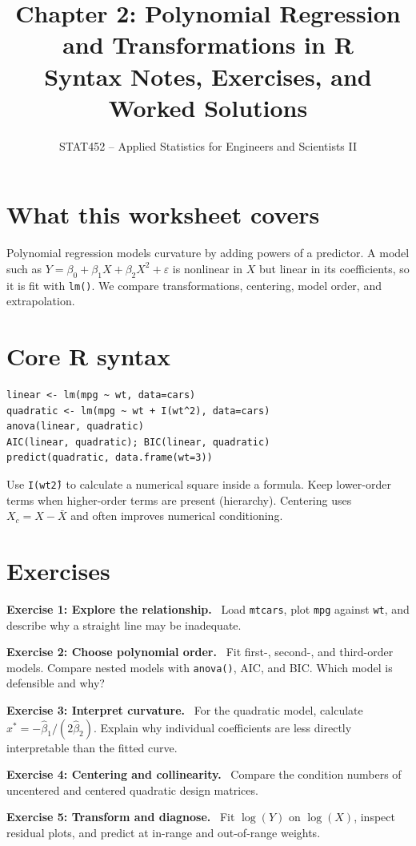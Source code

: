 \documentclass[11pt]{article}
\title{Chapter 2: Polynomial Regression and Transformations in R\\\large Syntax Notes, Exercises, and Worked Solutions}
\author{STAT452 -- Applied Statistics for Engineers and Scientists II}\date{}
\newenvironment{exercise}[1]{\par\medskip\noindent\color{navy}\textbf{Exercise #1.}\color{black}\ }{\par\medskip}
\begin{document}
\maketitle\tableofcontents\bigskip
\section{What this worksheet covers}
Polynomial regression models curvature by adding powers of a predictor. A model such as $Y=\beta_0+\beta_1X+\beta_2X^2+\varepsilon$ is nonlinear in $X$ but linear in its coefficients, so it is fit with \texttt{lm()}. We compare transformations, centering, model order, and extrapolation.
\section{Core R syntax}
\begin{lstlisting}
linear <- lm(mpg ~ wt, data=cars)
quadratic <- lm(mpg ~ wt + I(wt^2), data=cars)
anova(linear, quadratic)
AIC(linear, quadratic); BIC(linear, quadratic)
predict(quadratic, data.frame(wt=3))
\end{lstlisting}
Use \texttt{I(wt\^2)} to calculate a numerical square inside a formula. Keep lower-order terms when higher-order terms are present (hierarchy). Centering uses $X_c=X-\bar X$ and often improves numerical conditioning.
\section{Exercises}
\begin{exercise}{1: Explore the relationship} Load \texttt{mtcars}, plot \texttt{mpg} against \texttt{wt}, and describe why a straight line may be inadequate.\end{exercise}
\begin{exercise}{2: Choose polynomial order} Fit first-, second-, and third-order models. Compare nested models with \texttt{anova()}, AIC, and BIC. Which model is defensible and why?\end{exercise}
\begin{exercise}{3: Interpret curvature} For the quadratic model, calculate $x^*=-\hat\beta_1/(2\hat\beta_2)$. Explain why individual coefficients are less directly interpretable than the fitted curve.\end{exercise}
\begin{exercise}{4: Centering and collinearity} Compare the condition numbers of uncentered and centered quadratic design matrices.\end{exercise}
\begin{exercise}{5: Transform and diagnose} Fit $\log(Y)$ on $\log(X)$, inspect residual plots, and predict at in-range and out-of-range weights.\end{exercise}
\end{document}
